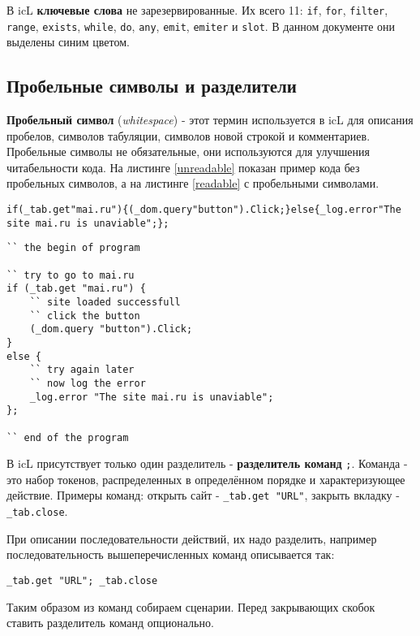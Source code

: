 \documentclass[a4paper, 14pt]{extarticle}
\begin{document}
В icL \textbf{ключевые слова} не зарезервированные. Их всего 11: \lstinline`if`, \lstinline`for`, \lstinline`filter`, \lstinline`range`, \lstinline`exists`, \lstinline`while`, \lstinline`do`, \lstinline`any`, \lstinline`emit`, \lstinline`emiter` и \lstinline`slot`. В данном документе они выделены синим цветом.
  
\subsection{Пробельные символы и разделители}
	
\textbf{Пробельный символ} (\textit{whitespace}) - этот термин используется в icL для описания пробелов, символов табуляции, символов новой строкой и комментариев. Пробельные символы не обязательные, они используются для улучшения читабельности кода. На листинге \ref{unreadable} показан пример кода без пробельных символов, а на листинге \ref{readable} с пробельными символами.
	
\begin{lstlisting}[caption=Koд без пробельных символов,label=unreadable]
if(_tab.get"mai.ru"){(_dom.query"button").Click;}else{_log.error"The site mai.ru is unaviable";};
\end{lstlisting}
	
\begin{lstlisting}[caption=Koд с пробельных символов,label=readable]
`` the begin of program

`` try to go to mai.ru
if (_tab.get "mai.ru") {
	`` site loaded successfull
	`` click the button
	(_dom.query "button").Click;
}
else {
	`` try again later
	`` now log the error
	_log.error "The site mai.ru is unaviable";
};

`` end of the program
\end{lstlisting}
	
В icL присутствует только один разделитель - \textbf{разделитель команд} \lstinline`;`. Команда - это набор токенов, распределенных в определённом порядке и характеризующее действие. Примеры команд: открыть сайт - \lstinline`_tab.get "URL"`, закрыть вкладку - \lstinline`_tab.close`.
	
При описании последовательности действий, их надо разделить, например последовательность вышеперечисленных команд описывается так:

\begin{lstlisting}[numbers=none]
_tab.get "URL"; _tab.close
\end{lstlisting} 
	
Таким образом из команд собираем сценарии. Перед закрывающих скобок ставить разделитель команд опционально.
	
\end{document}
